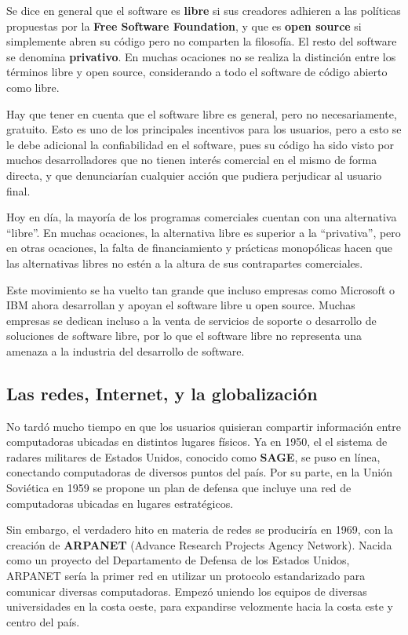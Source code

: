 Se dice en general que el software es \textbf{libre} si sus creadores adhieren a
las políticas propuestas por la \textbf{Free Software Foundation}, y que es
\textbf{open source} si simplemente abren su código pero no comparten la
filosofía. El resto del software se denomina \textbf{privativo}. En muchas
ocaciones no se realiza la distinción entre los términos libre y open source,
considerando a todo el software de código abierto como libre.

Hay que tener en cuenta que el software libre es general, pero no
necesariamente, gratuito. Esto es uno de los principales incentivos para los
usuarios, pero a esto se le debe adicional la confiabilidad en el software, pues
su código ha sido visto por muchos desarrolladores que no tienen interés
comercial en el mismo de forma directa, y que denunciarían cualquier acción que
pudiera perjudicar al usuario final.

Hoy en día, la mayoría de los programas comerciales cuentan con una alternativa
``libre''. En muchas ocaciones, la alternativa libre es superior a la
``privativa'', pero en otras ocaciones, la falta de financiamiento y prácticas
monopólicas hacen que las alternativas libres no estén a la altura de sus
contrapartes comerciales.

Este movimiento se ha vuelto tan grande que incluso empresas como Microsoft o
IBM ahora desarrollan y apoyan el software libre u open source. Muchas empresas
se dedican incluso a la venta de servicios de soporte o desarrollo de soluciones
de software libre, por lo que el software libre no representa una amenaza a la
industria del desarrollo de software.

\subsection{Las redes, Internet, y la globalización}
\label{chap:historia_computadoras:subsec:internet}

No tardó mucho tiempo en que los usuarios quisieran compartir información entre
computadoras ubicadas en distintos lugares físicos. Ya en 1950, el el sistema de
radares militares de Estados Unidos, conocido como \textbf{SAGE}, se puso en
línea, conectando computadoras de diversos puntos del país. Por su parte, en la
Unión Soviética en 1959 se propone un plan de defensa que incluye una red de
computadoras ubicadas en lugares estratégicos.

Sin embargo, el verdadero hito en materia de redes se produciría en 1969, con la
creación de \textbf{ARPANET} (Advance Research Projects Agency Network). Nacida
como un proyecto del Departamento de Defensa de los Estados Unidos, ARPANET
sería la primer red en utilizar un protocolo estandarizado para comunicar
diversas computadoras. Empezó uniendo los equipos de diversas universidades en
la costa oeste, para expandirse velozmente hacia la costa este y centro del
país.

